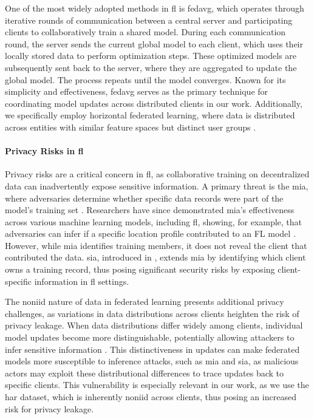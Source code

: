 One of the most widely adopted methods in \ac{fl} is \ac{fedavg}, which operates through iterative rounds of communication between a central server and participating clients to collaboratively train a shared model. During each communication round, the server sends the current global model to each client, which uses their locally stored data to perform optimization steps. These optimized models are subsequently sent back to the server, where they are aggregated to update the global model. The process repeats until the model converges. Known for its simplicity and effectiveness, \ac{fedavg} serves as the primary technique for coordinating model updates across distributed clients in our work. Additionally, we specifically employ horizontal federated learning, where data is distributed across entities with similar feature spaces but distinct user groups \cite{BG_HorizontalFL}.

\paragraph{\textbf{Privacy Risks in \ac{fl}}}
Privacy risks are a critical concern in \ac{fl}, as collaborative training on decentralized data can inadvertently expose sensitive information. A primary threat is the \ac{mia}, where adversaries determine whether specific data records were part of the model's training set \cite{shokri2017membership,BG_MIA}. Researchers have since demonstrated \ac{mia}'s effectiveness across various machine learning models, including \ac{fl}, showing, for example, that adversaries can infer if a specific location profile contributed to an FL model \cite{BG_MIA_1,BG_MIA_2}. However, while \ac{mia} identifies training members, it does not reveal the client that contributed the data. \ac{sia}, introduced in \cite{BG_SIA_2}, extends \ac{mia} by identifying which client owns a training record, thus posing significant security risks by exposing client-specific information in \ac{fl} settings.

The \ac{noniid} nature of data in federated learning presents additional privacy challenges, as variations in data distributions across clients heighten the risk of privacy leakage. When data distributions differ widely among clients, individual model updates become more distinguishable, potentially allowing attackers to infer sensitive information \cite{BG_NON_IID}. This distinctiveness in updates can make federated models more susceptible to inference attacks, such as \ac{mia} and \ac{sia}, as malicious actors may exploit these distributional differences to trace updates back to specific clients. This vulnerability is especially relevant in our work, as we use the \ac{har} dataset, which is inherently \ac{noniid} across clients, thus posing an increased risk for privacy leakage.





